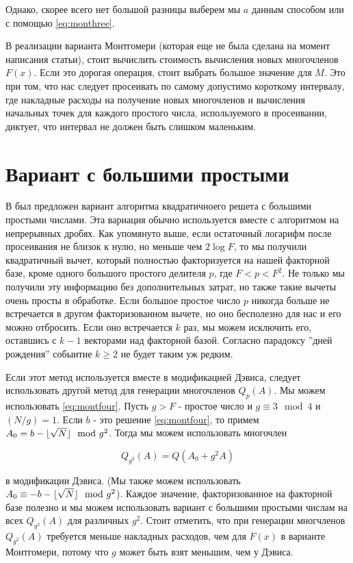 \documentclass[russian, utf8, a4paper,12pt]{report}
\DeclarePairedDelimiter\floor{\lfloor}{\rfloor}
\begin{document}
Однако, скорее всего нет большой разницы выберем мы $a$ данным способом или с помощью \eqref{eq:monthree}.

В реализации варианта Монтгомери (которая еще не была сделана на момент написания статьи), стоит вычислить стоимость вычисления новых многочленов $F(x)$. Если это дорогая операция, стоит выбрать большое значение для $M$. Это при том, что нас следует просеивать по самому допустимо короткому интервалу, где накладные расходы на получение новых многочленов и вычисления начальных точек для каждого простого числа, используемого в просеивании, диктует, что интервал не должен быть слишком маленьким.

\section{Вариант с большими простыми}
В \cite{pomer} был предложен вариант алгоритма квадратичноего решета с большими простыми числами. Эта вариация обычно используется вместе с алгоритмом на непрерывных дробях. Как упомянуто выше, если остаточный логарифм после просеивания не близок к нулю, но меньше чем $2 \log{F}$, то мы получили квадратичный вычет, который полностью факторизуется на нашей факторной базе, кроме одного большого простого делителя $p$, где $F < p < F^2$. Не только мы получили эту информацию без дополнительных затрат, но также такие вычеты очень просты в обработке. Если большое простое число $p$ никогда больше не встречается в другом факторизованном вычете, но оно бесполезно для нас и его можно отбросить. Если оно встречается $k$ раз, мы можем исключить его, оставшись с $k-1$ векторами над факторной базой. Согласно парадоксу ''дней рождения'' собыитие $k \geq 2$ не будет таким уж редким.

Если этот метод используется вместе в модификацией Дэвиса, следует использовать другой метод для генерации многочленов $Q_p(A)$. Мы можем использовать \eqref{eq:montfour}. Пусть $g > F$ - простое число и $g \equiv 3 \mod 4$ и $(N/g) = 1$. Если $b$ - это решение \eqref{eq:montfour}, то примем $A_0 = b- \floor{\sqrt{N}} \mod g^2$. Тогда мы можем использовать многочлен

\begin{equation*}
Q_{g^2}(A) = Q(A_0 + g^2A)
\end{equation*}

в модификации Дэвиса. (Мы также можем использовать $A_0 \equiv -b -\floor{\sqrt{N}} \mod g^2$).
Каждое значение, факторизованное на факторной базе полезно и мы можем использовать вариант с большими простыми числам на всех $Q_{g^2}(A)$ для различных $g^2$. Стоит отметить, что при генерации многчленов $Q_{g^2}(A)$ требуется меньше накладных расходов, чем для $F(x)$  в варианте Монтгомери, потому что $g$ может быть взят меньшим, чем у Дэвиса.
\end{document}
